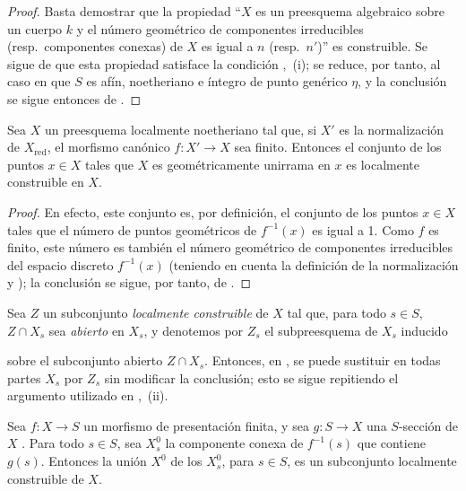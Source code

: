 \begin{proof}
Basta demostrar que la propiedad ``$X$ es un preesquema algebraico sobre un cuerpo $k$ y el número geométrico de componentes irreducibles (resp.\ componentes conexas) de $X$ es igual a $n$ (resp.\ $n'$)'' es construible. Se sigue de  que esta propiedad satisface la condición ,~(i); se reduce, por tanto, al caso en que $S$ es afín, noetheriano e íntegro de punto genérico $\eta$, y la conclusión se sigue entonces de .
\end{proof}

\begin{corollary}[9.7.10]
\label{IV.9.7.10}
Sea $X$ un preesquema localmente noetheriano tal que, si $X'$ es la normalización de $X_{\mathrm{red}}$, el morfismo canónico $f:X'\to X$ sea finito. Entonces el conjunto de los puntos $x\in X$ tales que $X$ es geométricamente unirrama en $x$ es localmente construible en $X$.
\end{corollary}

\begin{proof}
En efecto, este conjunto es, por definición, el conjunto de los puntos $x\in X$ tales que el número de puntos geométricos de $f^{-1}(x)$ es igual a 1. Como $f$ es finito, este número es también el número geométrico de componentes irreducibles del espacio discreto $f^{-1}(x)$ (teniendo en cuenta la definición de la normalización  y ); la conclusión se sigue, por tanto, de .
\end{proof}

\begin{remark}[9.7.11]
\label{IV.9.7.11}
Sea $Z$ un subconjunto \emph{localmente construible} de $X$ tal que, para todo $s\in S$, $Z\cap X_s$ sea \emph{abierto} en $X_s$, y denotemos por $Z_s$ el subpreesquema de $X_s$ inducido


sobre el subconjunto abierto $Z\cap X_s$. Entonces, en , se puede sustituir en todas partes $X_s$ por $Z_s$ sin modificar la conclusión; esto se sigue repitiendo el argumento utilizado en ,~(ii).
\end{remark}

\begin{proposition}[9.7.12]
\label{IV.9.7.12}
Sea $f:X\to S$ un morfismo de presentación finita, y sea $g:S\to X$ una $S$-sección de $X$ . Para todo $s\in S$, sea $X_s^0$ la componente conexa de $f^{-1}(s)$ que contiene $g(s)$. Entonces la unión $X^0$ de los $X_s^0$, para $s\in S$, es un subconjunto localmente construible de $X$.
\end{proposition}

